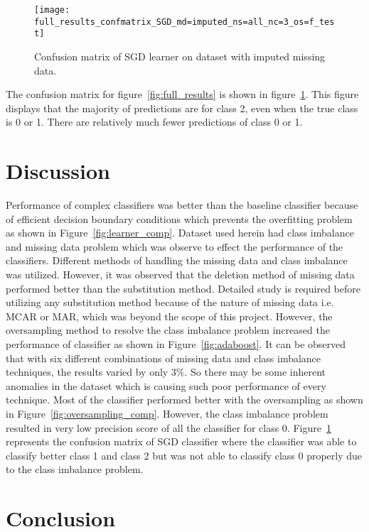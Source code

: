 \documentclass[conference]{IEEEtran}
\begin{document}
\begin{figure}[htpb]
	\centering
	\texttt{[image: full\_results\_confmatrix\_SGD\_md=imputed\_ns=all\_nc=3\_os=f\_test]}
	\caption{Confusion matrix of SGD learner on dataset with imputed missing data.}
	\label{fig:full_results_cm}
\end{figure}

The confusion matrix for figure~\ref{fig:full_results} is shown in figure~\ref{fig:full_results_cm}. This figure displays that the majority of predictions are for class 2, even when the true class is 0 or 1. There are relatively much fewer predictions of class 0 or 1.

\section{Discussion}

Performance of complex classifiers was better than the baseline classifier because of efficient decision boundary conditions which prevents the overfitting problem as shown in Figure~\ref{fig:learner_comp}. Dataset used herein had class imbalance and missing data problem which was observe to effect the performance of the classifiers. Different methods of handling the missing data and class imbalance was utilized. However, it was observed that the deletion method of missing data performed better than the substitution method. Detailed study is required before utilizing any substitution method because of the nature of missing data i.e. MCAR or MAR, which was beyond the scope of this project. However, the oversampling method to resolve the class imbalance problem increased the performance of classifier as shown in Figure~\ref{fig:adaboost}. It can be observed that with six different combinations of missing data and class imbalance techniques, the results varied by only 3\%. So there may be some inherent anomalies in the dataset which is causing such poor performance of every technique. Most of the classifier performed better with the oversampling as shown in Figure~\ref{fig:oversampling_comp}. However, the class imbalance problem resulted in very low precision score of all the classifier for class 0. Figure~\ref{fig:full_results_cm} represents the confusion matrix of SGD classifier where the classifier was able to classify better class 1 and class 2 but was not able to classify class 0 properly due to the class imbalance problem. 

\section{Conclusion}
\end{document}
